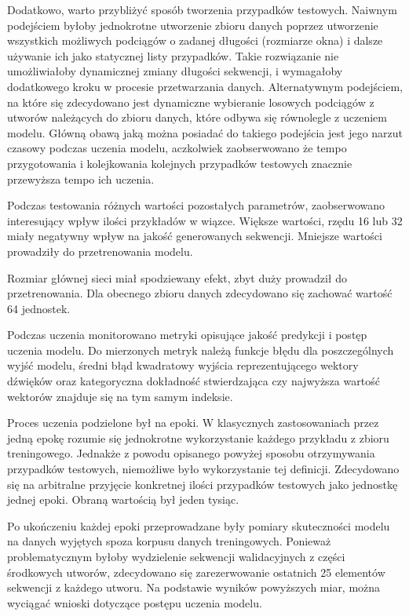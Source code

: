 {{        Dodatkowo, warto przybliżyć sposób tworzenia przypadków testowych. Naiwnym podejściem byłoby
        jednokrotne utworzenie zbioru danych poprzez utworzenie wszystkich możliwych podciągów o zadanej
        długości (rozmiarze okna) i dalsze używanie ich jako statycznej listy przypadków. 
        Takie rozwiązanie nie umożliwiałoby dynamicznej zmiany długości sekwencji, i wymagałoby dodatkowego 
        kroku w procesie przetwarzania danych. Alternatywnym podejściem, na które się zdecydowano jest dynamiczne
        wybieranie losowych podciągów z utworów należących do zbioru danych, które odbywa się równolegle z uczeniem modelu. 
        Główną obawą jaką można posiadać do takiego podejścia jest jego narzut czasowy podczas uczenia modelu, 
        aczkolwiek zaobserwowano że tempo przygotowania i kolejkowania kolejnych przypadków testowych znacznie przewyższa tempo ich uczenia.


        Podczas testowania różnych wartości pozostałych parametrów, zaobserwowano interesujący wpływ ilości przykładów w wiązce.
        Większe wartości, rzędu 16 lub 32 miały negatywny wpływ na jakość generowanych sekwencji. 
        Mniejsze wartości prowadziły do przetrenowania modelu.

        Rozmiar głównej sieci miał spodziewany efekt, zbyt duży prowadził do przetrenowania. Dla obecnego
        zbioru danych zdecydowano się zachować wartość 64 jednostek.


        Podczas uczenia monitorowano metryki opisujące jakość predykcji i postęp uczenia modelu.
        Do mierzonych metryk należą funkcje błędu dla poszczególnych wyjść modelu, średni błąd kwadratowy
        wyjścia reprezentującego wektory dźwięków oraz kategoryczna dokładność stwierdzająca czy najwyższa wartość
        wektorów znajduje się na tym samym indeksie.
        
        Proces uczenia podzielone był na epoki. W klasycznych zastosowaniach przez jedną epokę rozumie się jednokrotne
        wykorzystanie każdego przykładu z zbioru treningowego. Jednakże z powodu opisanego powyżej sposobu otrzymywania
        przypadków testowych, niemożliwe było wykorzystanie tej definicji. Zdecydowano się na arbitralne przyjęcie konkretnej 
        ilości przypadków testowych jako jednostkę jednej epoki. Obraną wartością był jeden tysiąc.

        Po ukończeniu każdej epoki przeprowadzane były pomiary skuteczności modelu na danych wyjętych spoza korpusu 
        danych treningowych. Ponieważ problematycznym byłoby wydzielenie sekwencji walidacyjnych z części środkowych
        utworów, zdecydowano się zarezerwowanie ostatnich 25 elementów sekwencji z każdego utworu.
        Na podstawie wyników powyższych miar, można wyciągać wnioski dotyczące postępu uczenia modelu.

}}
